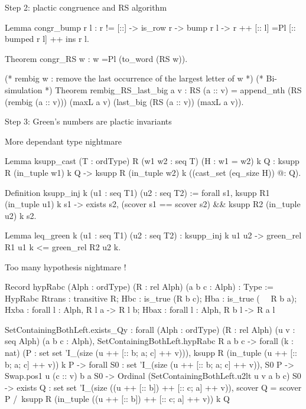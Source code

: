 \documentclass[compress,11pt]{beamer}
\begin{document}
\begin{frame}[fragile]{Step 2: plactic congruence and RS algorithm}

  \begin{coqcode}
Lemma congr_bump r l :
  r != [::] -> is_row r -> bump r l ->
  r ++ [:: l] =Pl [:: bumped r l] ++ ins r l.

Theorem congr_RS w : w =Pl (to_word (RS w)).

(* rembig w : remove the last occurrence of the largest letter of w *)
(* Bi-simulation *)
Theorem rembig_RS_last_big a v :
  RS (a :: v) = append_nth (RS (rembig (a :: v)))
                           (maxL a v)
                           (last_big (RS (a :: v)) (maxL a v)).
  \end{coqcode}
\end{frame}

\begin{frame}[fragile]{Step 3: Green's numbers are plactic invariants}

More dependant type nightmare
  \begin{coqcode}
Lemma ksupp_cast (T : ordType) R (w1 w2 : seq T) (H : w1 = w2) k Q :
  ksupp R (in_tuple w1) k Q ->
  ksupp R (in_tuple w2) k ((cast_set (eq_size H)) @: Q).

Definition ksupp_inj k (u1 : seq T1) (u2 : seq T2) :=
  forall s1, ksupp R1 (in_tuple u1) k s1 ->
    exists s2, (scover s1 == scover s2) && ksupp R2 (in_tuple u2) k s2.

Lemma leq_green k (u1 : seq T1) (u2 : seq T2) :
  ksupp_inj k u1 u2 -> green_rel R1 u1 k <= green_rel R2 u2 k.
  \end{coqcode}
\end{frame}


\begin{frame}[fragile]{Too many hypothesis nightmare !}
  \begin{coqcode}
Record hypRabc (Alph : ordType) (R : rel Alph) (a b c : Alph) : 
Type := HypRabc
  { Rtrans : transitive R;
    Hbc : is_true (R b c);
    Hba : is_true (~~ R b a);
    Hxba : forall l : Alph, R l a -> R l b;
    Hbax : forall l : Alph, R b l -> R a l }

SetContainingBothLeft.exists_Qy
     : forall (Alph : ordType) (R : rel Alph) (u v : seq Alph) (a b c : Alph),
       SetContainingBothLeft.hypRabc R a b c ->
       forall (k : nat) (P : {set {set 'I_(size (u ++ [:: b; a; c] ++ v))}}),
       ksupp R (in_tuple (u ++ [:: b; a; c] ++ v)) k P ->
       forall S0 : {set 'I_(size (u ++ [:: b; a; c] ++ v))},
       S0 \in P ->
       Swap.pos1 u (c :: v) b a \in S0 ->
       Ordinal (SetContainingBothLeft.u2lt u v a b c) \in S0 ->
       exists Q : {set {set 'I_(size ((u ++ [:: b]) ++ [:: c; a] ++ v))}},
         scover Q = scover P /\
         ksupp R (in_tuple ((u ++ [:: b]) ++ [:: c; a] ++ v)) k Q
  \end{coqcode}
\end{frame}
\end{document}
